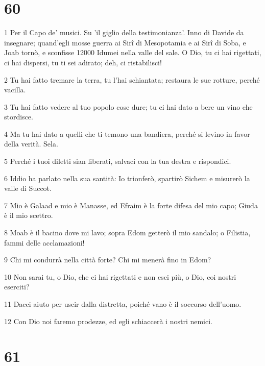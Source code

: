\chapter{60}

\par 1 Per il Capo de' musici. Su 'il giglio della testimonianza'. Inno di Davide da insegnare; quand'egli mosse guerra ai Sirî di Mesopotamia e ai Sirî di Soba, e Joab tornò, e sconfisse 12000 Idumei nella valle del sale. O Dio, tu ci hai rigettati, ci hai dispersi, tu ti sei adirato; deh, ci ristabilisci!
\par 2 Tu hai fatto tremare la terra, tu l'hai schiantata; restaura le sue rotture, perché vacilla.
\par 3 Tu hai fatto vedere al tuo popolo cose dure; tu ci hai dato a bere un vino che stordisce.
\par 4 Ma tu hai dato a quelli che ti temono una bandiera, perché si levino in favor della verità. Sela.
\par 5 Perché i tuoi diletti sian liberati, salvaci con la tua destra e rispondici.
\par 6 Iddio ha parlato nella sua santità: Io trionferò, spartirò Sichem e misurerò la valle di Succot.
\par 7 Mio è Galaad e mio è Manasse, ed Efraim è la forte difesa del mio capo; Giuda è il mio scettro.
\par 8 Moab è il bacino dove mi lavo; sopra Edom getterò il mio sandalo; o Filistia, fammi delle acclamazioni!
\par 9 Chi mi condurrà nella città forte? Chi mi menerà fino in Edom?
\par 10 Non sarai tu, o Dio, che ci hai rigettati e non esci più, o Dio, coi nostri eserciti?
\par 11 Dacci aiuto per uscir dalla distretta, poiché vano è il soccorso dell'uomo.
\par 12 Con Dio noi faremo prodezze, ed egli schiaccerà i nostri nemici.

\chapter{61}

